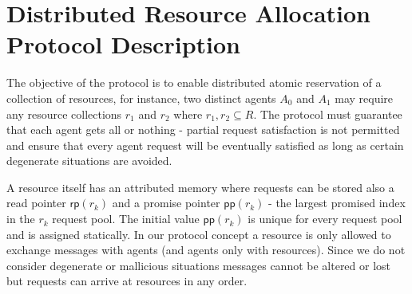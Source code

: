 \section{Distributed Resource Allocation Protocol Description}
\label{section3}

The objective of the protocol is to enable distributed atomic reservation of a collection of resources, for instance, two distinct agents $A_0$ and $A_1$ may require any resource collections $r_1$ and $r_2$ where $r_1, r_2 \subseteq R$. The protocol must guarantee that each agent gets all or nothing - partial request satisfaction is not permitted and ensure that every agent request will be eventually satisfied as long as certain degenerate situations are avoided. 

A resource itself has an attributed memory where requests can be stored also a read pointer $\mathsf{rp}(r_k)$ and a promise pointer $\mathsf{pp}(r_k)$ - the largest {promised} index in the $r_k$ request pool. The initial value $\mathsf{pp}(r_k)$ is unique for every request pool and is assigned statically. In our protocol concept a resource is only allowed to exchange messages with agents (and agents only with resources). Since we do not consider degenerate or mallicious situations messages cannot be altered or lost but requests can arrive at resources in any order.

